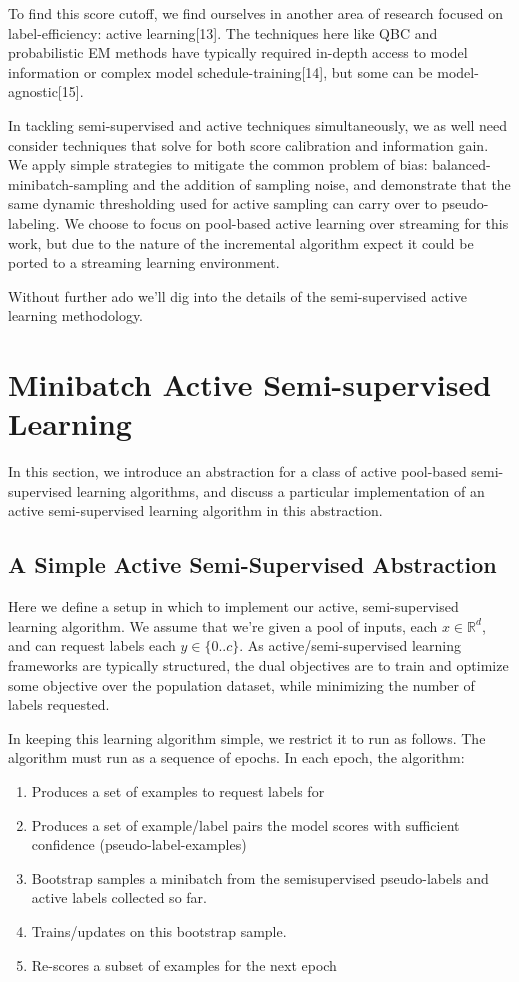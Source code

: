 \documentclass{article}
\begin{document}
To find this score cutoff, we find ourselves in another area of research focused on label-efficiency: active learning[13].  The techniques here like QBC and probabilistic EM methods have typically required in-depth access to model information or complex model schedule-training[14], but some can be model-agnostic[15].  

In tackling semi-supervised and active techniques simultaneously, we as well need consider techniques that solve for both score calibration and information gain.  We apply simple strategies to mitigate the common problem of bias: balanced-minibatch-sampling and the addition of sampling noise, and demonstrate that the same dynamic thresholding used for active sampling can carry over to pseudo-labeling.  
We choose to focus on pool-based active learning over streaming for this work, but due to the nature of the incremental algorithm expect it could be ported to a streaming learning environment.  

Without further ado we'll dig into the details of the semi-supervised active learning methodology.  

\section{Minibatch Active Semi-supervised Learning}
In this section, we introduce an abstraction for a class of active pool-based semi-supervised learning algorithms, and discuss a particular implementation of an active semi-supervised learning algorithm in this abstraction.

\subsection{A Simple Active Semi-Supervised Abstraction}
Here we define a setup in which to implement our active, semi-supervised learning algorithm.  We assume that we're given a pool of inputs, each $x \in \mathbb{R}^{d}$, and can request labels each $y\in\{0..c\}$.  As active/semi-supervised learning frameworks are typically structured, the dual objectives are to train and optimize some objective over the population dataset, while minimizing the number of labels requested.  

In keeping this learning algorithm simple, we restrict it to run as follows.  The algorithm must run as a sequence of epochs.  In each epoch, the algorithm:
\begin{enumerate}
\item Produces a set of examples to request labels for
\item Produces a set of example/label pairs the model scores with sufficient confidence (pseudo-label-examples)
\item Bootstrap samples a minibatch from the semisupervised pseudo-labels and active labels collected so far.
\item Trains/updates on this bootstrap sample.
\item Re-scores a subset of examples for the next epoch
\end{enumerate}
\end{document}
